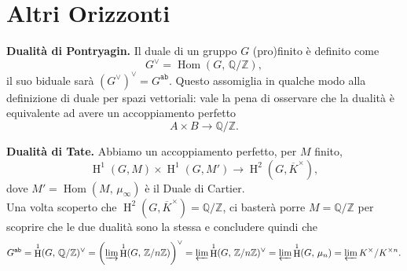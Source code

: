 \documentclass[a4paper]{article}
\theoremstyle{remark}
\theoremstyle{definition}
\newcommand{\Z}{\mathbb{Z}}
\newcommand{\Q}{\mathbb{Q}}
\DeclareMathOperator{\Hom}{Hom}
\DeclareMathOperator{\HH}{H}
\begin{document}
\section*{Altri Orizzonti}

\textbf{Dualità di Pontryagin.} Il duale di un gruppo $ G $ (pro)finito è definito come
\[ G^\vee = \Hom(G, \, \Q/\Z), \]
il suo biduale sarà $ (G^\vee)^\vee = G^{\texttt{ab}} $. Questo assomiglia in qualche modo alla definizione di duale per spazi vettoriali: vale la pena di osservare che la dualità è equivalente ad avere un accoppiamento perfetto
\[ A \times B \to \Q / \Z. \]

\textbf{Dualità di Tate.} Abbiamo un accoppiamento perfetto, per $ M $ finito, 
\[ \HH^1(G, M) \times \HH^1(G, M') \to \HH^2(G, \overline{K}^\times), \]
dove $ M' = \Hom(M, \,\mu_\infty) $ è il Duale di Cartier. \\

Una volta scoperto che $ \HH^2(G, \overline{K}^\times) = \Q / \Z $, ci basterà porre $ M = \Q/\Z $ per scoprire che le due dualità sono la stessa e concludere quindi che 
\[ G^\texttt{ab} = \HH^1(G, \, \Q/ \Z)^\vee = \left( \varinjlim \HH^1(G, \, \Z / n\Z) \right)^\vee = \varprojlim \HH^1(G, \, \Z / n\Z)^\vee =  \varprojlim \HH^1(G, \, \mu_n ) = \varprojlim K^\times / K^{\times n}. \]
\end{document}
